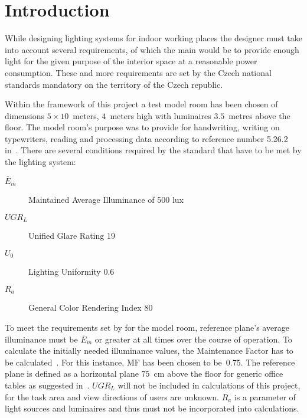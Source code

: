 \section{Introduction} \label{sec:intro}
While designing lighting systems for indoor working places the designer must take into account several requirements, of which the main would be to provide enough light for the given purpose of the interior space at a reasonable power consumption. These and more requirements are set by the Czech national standards \cite{12464} mandatory on the territory of the Czech republic.

Within the framework of this project a test model room has been chosen of dimensions $5 \times 10 $~meters, $4$~meters high with luminaires $3.5$~metres above the floor. The model room's purpose was to provide for handwriting, writing on typewriters, reading and processing data according to reference number 5.26.2 in~\cite{12464}. There are several conditions required by the standard that have to be met by the lighting system:

\begin{description}
	\item[$\overline{E}_{m}$] Maintained Average Illuminance of 500 lux
	\item[$UGR_{L}$] Unified Glare Rating 19
	\item[$U_{0}$] Lighting Uniformity 0.6
	\item[$R_{a}$] General Color Rendering Index 80
\end{description}


To meet the requirements set by \cite{12464} for the model room, reference plane's average illuminance must be $\overline{E}_{m}$ or greater at all times over the course of operation. To calculate the initially needed illuminance values, the Maintenance Factor has to be calculated~\cite{CIE97}. For this instance, MF has been chosen to be~$0.75$. The reference plane is defined as a horizontal plane $75$~cm above the floor for generic office tables as suggested in~\cite{12464}. $UGR_{L}$ will not be included in calculations of this project, for the task area and view directions of users are unknown. $R_{a}$ is a parameter of light sources and luminaires and thus must not be incorporated into calculations.